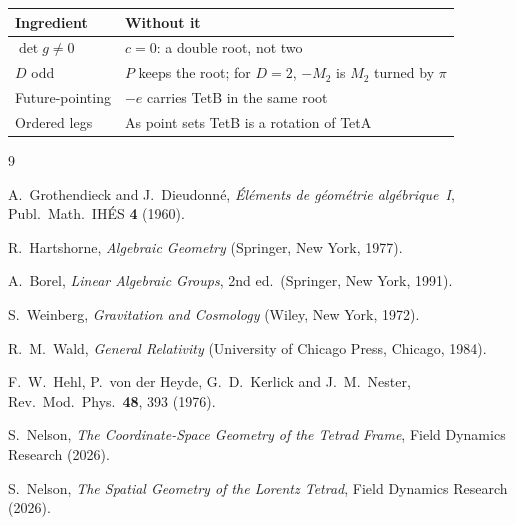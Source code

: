 \documentclass[twocolumn]{iopjournal}
\begin{document}
\vspace{2pt}
\noindent
\begin{tabular*}{\columnwidth}{@{\extracolsep{\fill}}l>{\raggedright\arraybackslash}p{}@{}}
\hline
Ingredient & Without it \\
\hline
$\det g \ne 0$ & $c = 0$: a double root, not two \\
$D$ odd & $P$ keeps the root; for $D = 2$, $-M_2$ is $M_2$ turned by
  $\pi$ \\
Future-pointing & $-e$ carries TetB in the same root \\
Ordered legs & As point sets TetB is a rotation of TetA \\
\hline
\end{tabular*}
\vspace{4pt}


\begin{thebibliography}{9}

A.~Grothendieck and J.~Dieudonn\'{e},
\textit{\'{E}l\'{e}ments de g\'{e}om\'{e}trie alg\'{e}brique~I},
Publ.\ Math.\ IH\'{E}S \textbf{4} (1960).

R.~Hartshorne,
\textit{Algebraic Geometry}
(Springer, New York, 1977).

A.~Borel,
\textit{Linear Algebraic Groups}, 2nd ed.\
(Springer, New York, 1991).

S.~Weinberg,
\textit{Gravitation and Cosmology}
(Wiley, New York, 1972).

R.~M.~Wald,
\textit{General Relativity}
(University of Chicago Press, Chicago, 1984).

F.~W.~Hehl, P.~von der Heyde, G.~D.~Kerlick and J.~M.~Nester,
Rev.\ Mod.\ Phys.\ \textbf{48}, 393 (1976).

S.~Nelson,
\textit{The Coordinate-Space Geometry of the Tetrad Frame},
Field Dynamics Research (2026).

S.~Nelson,
\textit{The Spatial Geometry of the Lorentz Tetrad},
Field Dynamics Research (2026).

\end{thebibliography}
\end{document}
